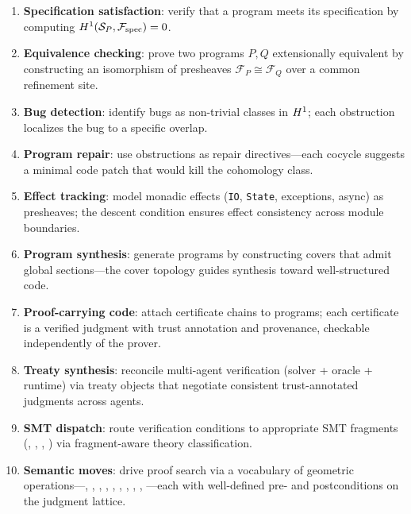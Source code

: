 \begin{enumerate}[label=(\arabic*),leftmargin=2em,itemsep=2pt]
  \item \textbf{Specification satisfaction}: verify that a program meets its
        specification by computing $H^{1}(\mathcal{S}_P, \mathcal{F}_{\mathrm{spec}}) = 0$.
  \item \textbf{Equivalence checking}: prove two programs $P, Q$ extensionally
        equivalent by constructing an isomorphism of presheaves
        $\mathcal{F}_P \cong \mathcal{F}_Q$ over a common refinement site.
  \item \textbf{Bug detection}: identify bugs as non-trivial classes in
        $H^{1}$; each obstruction localizes the bug to a specific overlap.
  \item \textbf{Program repair}: use obstructions as repair directives---each
        cocycle suggests a minimal code patch that would kill the cohomology class.
  \item \textbf{Effect tracking}: model monadic effects (\texttt{IO},
        \texttt{State}, exceptions, async) as presheaves; the descent condition
        ensures effect consistency across module boundaries.
  \item \textbf{Program synthesis}: generate programs by constructing covers
        that admit global sections---the cover topology guides synthesis toward
        well-structured code.
  \item \textbf{Proof-carrying code}: attach certificate chains to programs;
        each certificate is a verified judgment with trust annotation and
        provenance, checkable independently of the prover.
  \item \textbf{Treaty synthesis}: reconcile multi-agent verification
        (solver + oracle + runtime) via treaty objects that negotiate
        consistent trust-annotated judgments across agents.
  \item \textbf{SMT dispatch}: route verification conditions to appropriate
        SMT fragments (\QFLIA{}, \QFLRA{}, \QFBV{}, \QFUF{}) via
        fragment-aware theory classification.
  \item \textbf{Semantic moves}: drive proof search via a vocabulary of
        geometric operations---\VERIFY{}, \CONSTRUCT{}, \NORMALIZE{},
        \GLUE{}, \RESTRICT{}, \TRANSPORT{}, \REPAIR{}, \PROMOTE{},
        \CHALLENGE{}, \ESCALATE{}---each with well-defined pre- and
        postconditions on the judgment lattice.
\end{enumerate}

